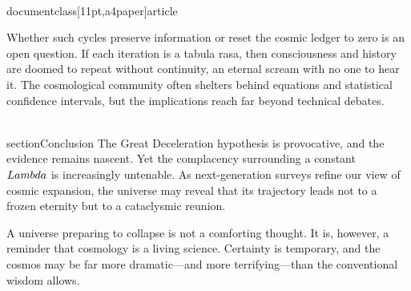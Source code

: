 \\documentclass[11pt,a4paper]{article}
\begin{document}
Whether such cycles preserve information or reset the cosmic ledger to zero is an open question. If each iteration is a tabula rasa, then consciousness and history are doomed to repeat without continuity, an eternal scream with no one to hear it. The cosmological community often shelters behind equations and statistical confidence intervals, but the implications reach far beyond technical debates.

\\section{Conclusion}
The Great Deceleration hypothesis is provocative, and the evidence remains nascent. Yet the complacency surrounding a constant \\$\\Lambda\\$ is increasingly untenable. As next-generation surveys refine our view of cosmic expansion, the universe may reveal that its trajectory leads not to a frozen eternity but to a cataclysmic reunion.

A universe preparing to collapse is not a comforting thought. It is, however, a reminder that cosmology is a living science. Certainty is temporary, and the cosmos may be far more dramatic---and more terrifying---than the conventional wisdom allows.

\
\end{document}
